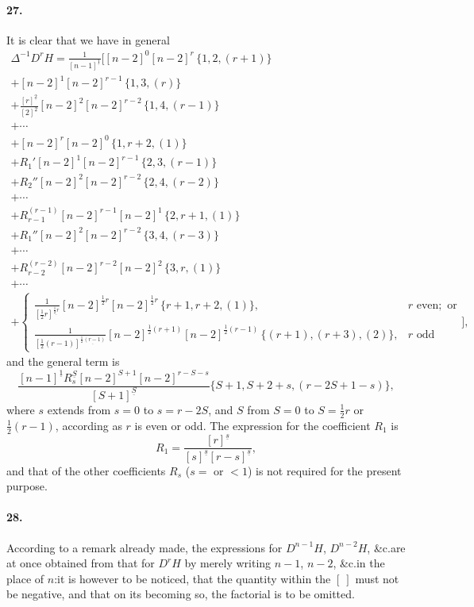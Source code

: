 \documentclass[11pt,a4paper]{book}
\begin{document}
\paragraph{27.}
It  is  clear  that  we  have  in  general
\begin{multline*}
\Delta^{-1} D^r H = \frac{1}{[n-1]^{\underline{1}}} \Bigg[
    [n-2]^0 [n-2]^r \, \{1, 2, (r+1)\} \\
  + [n-2]^1 [n-2]^{r-1} \, \{1, 3, (r)\} \\
  + \frac{[r]^{\underline{2}}}{[2]^{\underline{2}}} [n-2]^2 [n-2]^{r-2} \, \{1, 4, (r-1)\} \\
  + \cdots \\
  + [n-2]^r [n-2]^0 \, \{1, r+2, (1)\} \\
  + R_1'    [n-2]^1 [n-2]^{r-1} \, \{2, 3, (r-1)\} \\
  + R_2''   [n-2]^2 [n-2]^{r-2} \, \{2, 4, (r-2)\} \\
  + \cdots \\
  + R_{r-1}^{(r-1)} [n-2]^{r-1} [n-2]^1 \, \{2, r+1, (1)\} \\
  + R_1''    [n-2]^2 [n-2]^{r-2} \, \{3, 4, (r-3)\} \\
  + \cdots \\
  + R_{r-2}^{(r-2)} [n-2]^{r-2} [n-2]^2 \, \{3, r, (1)\} \\
  + \cdots \\
  + \begin{cases}
    \frac{1}{[\frac{1}{2}r]^{\underline{\frac{1}{2}r}}} [n-2]^{\frac{1}{2}r} [n-2]^{\frac{1}{2}r} \, \{r+1, r+2, (1)\}, & r \text{ even}; \text{ or} \\
    \frac{1}{[\frac{1}{2}(r-1)]^{\underline{\frac{1}{2}(r-1)}}} [n-2]^{\frac{1}{2}(r+1)} [n-2]^{\frac{1}{2}(r-1)} \, \{(r+1), (r+3), (2)\}, & r \text{ odd}
    \end{cases}
\Bigg],
\end{multline*}
and  the  general  term  is
\[
\frac{[n-1]^{\underline{1}} R_s^{\underline{S}} [n-2]^{S+1} [n-2]^{r-S-s}}{[S+1]^{\underline{S}}}
    \{S+1, S+2+s, (r-2S+1-s)\},
\]
where  $s$  extends  from  $s = 0$  to  $s = r - 2S$,  and  $S$  from  $S = 0$  to  $S = \frac{1}{2}r$  or  $\frac{1}{2}(r-1)$,  according
as  $r$  is  even  or  odd.     The  expression  for  the  coefficient  $R_1$  is
\[
R_1 = \frac{[r]^{\underline{s}}}{[s]^{\underline{s}} [r-s]^{\underline{s}}},
\]
and  that  of  the  other  coefficients  $R_s$ ($s = $ or $< 1$)  is  not  required  for  the  present  purpose.

\paragraph{28.}
According  to  a  remark  already  made,  the  expressions  for  $D^{n-1}H$, $D^{n-2}H$,  \&c.\@  are
at  once  obtained  from  that  for  $D^r H$  by  merely  writing  $n-1$, $n-2$,  \&c.\@  in  the  place
of  $n$:\@  it  is  however  to  be  noticed,  that  the  quantity  within  the  $[\ ]$  must  not  be
negative,  and  that  on  its  becoming  so,  the  factorial  is  to  be  omitted.
\end{document}
